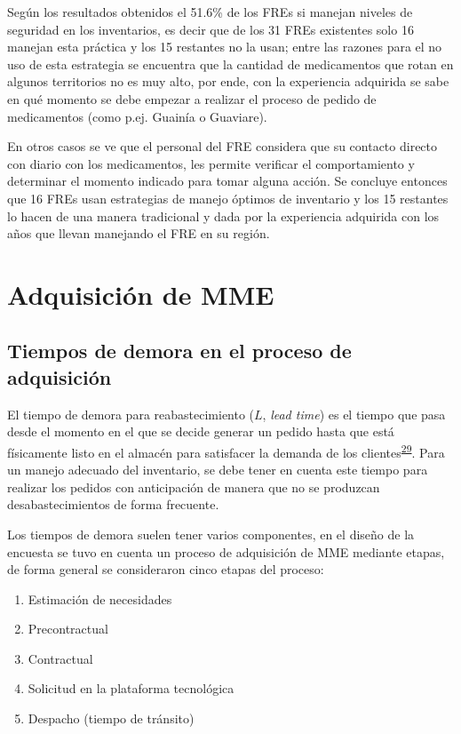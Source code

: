 \documentclass[
]{book}
\begin{document}
Según los resultados obtenidos el 51.6\% de los FREs si manejan niveles de seguridad en los inventarios, es decir que de los 31 FREs existentes solo 16 manejan esta práctica y los 15 restantes no la usan; entre las razones para el no uso de esta estrategia se encuentra que la cantidad de medicamentos que rotan en algunos territorios no es muy alto, por ende, con la experiencia adquirida se sabe en qué momento se debe empezar a realizar el proceso de pedido de medicamentos (como p.ej. Guainía o Guaviare).

En otros casos se ve que el personal del FRE considera que su contacto directo con diario con los medicamentos, les permite verificar el comportamiento y determinar el momento indicado para tomar alguna acción. Se concluye entonces que 16 FREs usan estrategias de manejo óptimos de inventario y los 15 restantes lo hacen de una manera tradicional y dada por la experiencia adquirida con los años que llevan manejando el FRE en su región.

\hypertarget{adquisiciuxf3n-de-mme}{%
\section{Adquisición de MME}\label{adquisiciuxf3n-de-mme}}

\hypertarget{tiempos-de-demora-en-el-proceso-de-adquisiciuxf3n}{%
\subsection{Tiempos de demora en el proceso de adquisición}\label{tiempos-de-demora-en-el-proceso-de-adquisiciuxf3n}}

El tiempo de demora para reabastecimiento (\(L\), \emph{lead time}) es el tiempo que pasa desde el momento en el que se decide generar un pedido hasta que está físicamente listo en el almacén para satisfacer la demanda de los clientes\textsuperscript{\protect\hyperlink{ref-Silver2017}{29}}. Para un manejo adecuado del inventario, se debe tener en cuenta este tiempo para realizar los pedidos con anticipación de manera que no se produzcan desabastecimientos de forma frecuente.

Los tiempos de demora suelen tener varios componentes, en el diseño de la encuesta se tuvo en cuenta un proceso de adquisición de MME mediante etapas, de forma general se consideraron cinco etapas del proceso:

\begin{enumerate}
\def\labelenumi{\arabic{enumi}.}
\item
  Estimación de necesidades
\item
  Precontractual
\item
  Contractual
\item
  Solicitud en la plataforma tecnológica
\item
  Despacho (tiempo de tránsito)
\end{enumerate}
\end{document}
